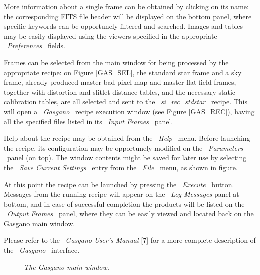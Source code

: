 More information about a single frame
can be obtained by clicking on its name: the corresponding
FITS file header will be displayed on the bottom panel, where
specific keywords can be opportunely filtered and searched.
Images and tables may be easily displayed using the 
viewers specified in the appropriate \ {\it Preferences} \ fields.



Frames can be selected from the main window for being processed
by the appropriate recipe: on Figure \ref{GAS_SEL}, the standard star frame 
and a sky frame, already produced master bad pixel map and 
master flat field frames, together with distortion and slitlet distance tables,
and the necessary static calibration tables, are all selected 
and sent to the \ {\it si\_rec\_stdstar} \ recipe. This will
open a \ {\it Gasgano} \ recipe execution window (see Figure
\ref{GAS_REC}), having all the specified files listed in its 
\ {\it Input Frames} \ panel.

Help about the recipe may be obtained from the \ {\it Help} \ menu.
Before launching the recipe, its configuration may be
opportunely modified on the \ {\it Parameters} \ panel (on top). 
The window contents might be saved for later use
by selecting the \ {\it Save Current Settings} \ entry from the 
\ {\it File} \ menu, as shown in figure.

At this point the recipe can be launched by pressing the \ {\it Execute} \
button. Messages from the
running recipe will appear on the \ {\it Log Messages} panel at
bottom, and in case of successful completion the products will be listed
on the \ {\it Output Frames} \ panel, where they can be easily viewed
and located back on the Gasgano main window.

Please refer to the \ {\it Gasgano User's Manual} [7] for a more complete
description of the \ {\it Gasgano} \ interface.


\clearpage
\begin{figure}[h]
\begin{center}
\end{center}
\caption{\it The Gasgano main window.}
\label{GAS_MAIN}
\end{figure}



